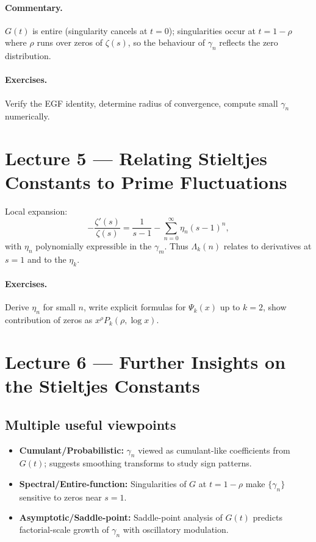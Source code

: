 \documentclass[11pt]{article}
\newcommand{\LM}{\Lambda}
\newcommand{\z}{\zeta}
\begin{document}
\paragraph{Commentary.} $G(t)$ is entire (singularity cancels at $t=0$); singularities occur at $t=1-\rho$ where $\rho$ runs over zeros of $\z(s)$, so the behaviour of $\gamma_n$ reflects the zero distribution.

\paragraph{Exercises.} Verify the EGF identity, determine radius of convergence, compute small $\gamma_n$ numerically.

\section{Lecture 5 --- Relating Stieltjes Constants to Prime Fluctuations}
Local expansion:
\[
-\frac{\z'(s)}{\z(s)}=\frac{1}{s-1}-\sum_{n=0}^\infty \eta_n (s-1)^n,
\]
with $\eta_n$ polynomially expressible in the $\gamma_m$. Thus $\LM_k(n)$ relates to derivatives at $s=1$ and to the $\eta_k$.

\paragraph{Exercises.} Derive $\eta_n$ for small $n$, write explicit formulas for $\Psi_k(x)$ up to $k=2$, show contribution of zeros as $x^\rho P_k(\rho,\log x)$.

\section{Lecture 6 --- Further Insights on the Stieltjes Constants}
\subsection*{Multiple useful viewpoints}
\begin{itemize}
\item \textbf{Cumulant/Probabilistic:} $\gamma_n$ viewed as cumulant-like coefficients from $G(t)$; suggests smoothing transforms to study sign patterns.
\item \textbf{Spectral/Entire-function:} Singularities of $G$ at $t=1-\rho$ make $\{\gamma_n\}$ sensitive to zeros near $s=1$.
\item \textbf{Asymptotic/Saddle-point:} Saddle-point analysis of $G(t)$ predicts factorial-scale growth of $\gamma_n$ with oscillatory modulation.
\end{itemize}
\end{document}
